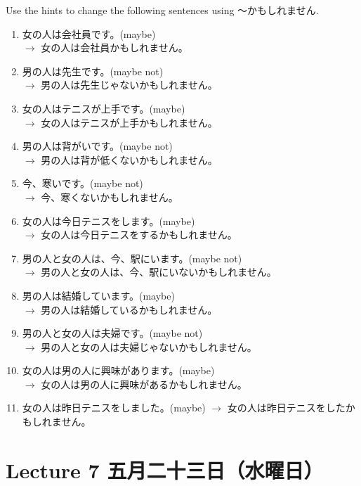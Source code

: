 \documentclass[notoc,notitlepage]{tufte-book}
\begin{document}
\begin{ex}
  Use the hints to change the following sentences using 〜かもしれません.

  \begin{enumerate}
    \item 女の人は会社員です。(maybe) \\
      $\to$ 女の人は会社員かもしれません。
    \item 男の人は先生です。(maybe not) \\
      $\to$ 男の人は先生じゃないかもしれません。
    \item 女の人はテニスが上手です。(maybe) \\
      $\to$ 女の人はテニスが上手かもしれません。
    \item 男の人は背がいです。(maybe not) \\
      $\to$ 男の人は背が低くないかもしれません。
    \item 今、寒いです。(maybe not) \\
      $\to$ 今、寒くないかもしれません。
    \item 女の人は今日テニスをします。(maybe) \\
      $\to$ 女の人は今日テニスをするかもしれません。
    \item 男の人と女の人は、今、駅にいます。(maybe not) \\
      $\to$ 男の人と女の人は、今、駅にいないかもしれません。
    \item 男の人は結婚しています。(maybe) \\
      $\to$ 男の人は結婚しているかもしれません。
    \item 男の人と女の人は夫婦です。(maybe not) \\
      $\to$ 男の人と女の人は夫婦じゃないかもしれません。
    \item 女の人は男の人に興味があります。(maybe) \\
      $\to$ 女の人は男の人に興味があるかもしれません。
    \item 女の人は昨日テニスをしました。(maybe)
      $\to$ 女の人は昨日テニスをしたかもしれません。
  \end{enumerate}
\end{ex}



\chapter{Lecture 7 五月二十三日（水曜日）}%
\label{chp:lecture_7_wu_yue_er_shi_san_ri_shui_yao_ri_}
\end{document}
